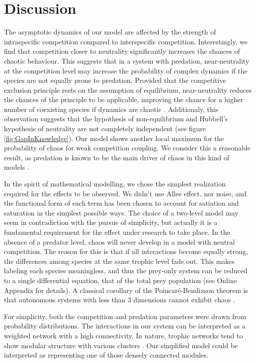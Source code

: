 \section{Discussion}
\label{sec:Discussion}
The asymptotic dynamics of our model are affected by the strength of intraspecific competition compared to interspecific competition. Interestingly, we find that competition closer to neutrality significantly increases the chances of chaotic behaviour. This suggests that in a system with predation, near-neutrality at the competition level may increase the probability of complex dynamics if the species are not equally prone to predation. Provided that the competitive exclusion principle rests on the assumption of equilibrium, near-neutrality reduces the chances of the principle to be applicable, improving the chance for a higher number of coexisting species if dynamics are chaotic \cite{Huisman1999}. Additionaly, this observation suggests that the hypothesis of non-equilibrium and Hubbell's hypothesis of neutrality are not completely independent (see figure \ref{fig:GapInKnowledge}). Our model shows another local maximum for the probability of chaos for weak competition coupling. We consider this a reasonable result, as predation is known to be the main driver of chaos in this kind of models \cite{Scheffer2004}.

In the spirit of mathematical modelling, we chose the simplest realization required for the effects to be observed. We didn't use Allee effect, nor noise, and the functional form of each term has been chosen to account for satiation and saturation in the simplest possible ways. The choice of a two-level model may seem in contradiction with the pursue of simplicity, but actually it is a fundamental requirement for the effect under research to take place. In the absence of a predator level, chaos will never develop in a model with neutral competition. The reason for this is that if all interactions become equally strong, the differences among species at the same trophic level fade out. This makes labeling each species meaningless, and thus the prey-only system can be reduced to a single differential equation, that of the total prey population (see Online Appendix for details). A classical corollary of the Poincaré-Bendixson theorem is that autonomous systems with less than $3$ dimensions cannot exhibit chaos \cite{Strogatz1994}.

For simplicity, both the competition and predation parameters were drawn from probability distributions. The interactions in our system can be interpreted as a weighted network with a high connectivity. In nature, trophic networks tend to show modular structure with various clusters \cite{Thebault2010}. Our simplified model could be interpreted as representing one of those densely connected modules.

